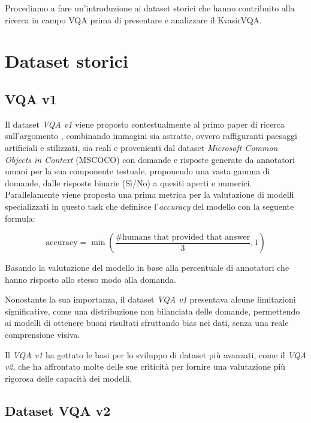 \documentclass[../main.tex]{subfiles}
\begin{document}
Procediamo a fare un'introduzione ai dataset storici che hanno contribuito alla ricerca in campo VQA prima di presentare e analizzare il KvasirVQA.

\section{Dataset storici}

\subsection{VQA v1}

Il dataset \textit{VQA v1} viene proposto contestualmente al primo paper di ricerca sull'argomento \cite{DBLP:journals/corr/AntolALMBZP15}, combinando immagini sia astratte, ovvero raffiguranti paesaggi artificiali e stilizzati, sia reali e provenienti dal dataset \textit{Microsoft Common Objects in Context} (MSCOCO) \cite{lin2015microsoftcococommonobjects} con domande e risposte generate da annotatori umani per la sua componente testuale, proponendo una vasta gamma di domande, dalle risposte binarie (Sì/No) a quesiti aperti e numerici.
Parallelamente viene proposta una prima metrica per la valutazione di modelli specializzati in questo task che definisce l'\textit{accuracy} del modello con la seguente formula:

\begin{equation}
    \text{accuracy} = \min\left(\frac{\text{\#humans that provided that answer}}{3}, 1\right)
    \label{eq:accuracy}
\end{equation}

Basando la valutazione del modello in base alla percentuale di annotatori che hanno risposto allo stesso modo alla domanda.

Nonostante la sua importanza, il dataset \textit{VQA v1} presentava alcune limitazioni significative, come una distribuzione non bilanciata delle domande, permettendo ai modelli di ottenere buoni risultati sfruttando bias nei dati, senza una reale comprensione visiva.

Il \textit{VQA v1} ha gettato le basi per lo sviluppo di dataset più avanzati, come il \textit{VQA v2}, che ha affrontato molte delle sue criticità per fornire una valutazione più rigorosa delle capacità dei modelli.

\subsection{Dataset VQA v2}
\end{document}

